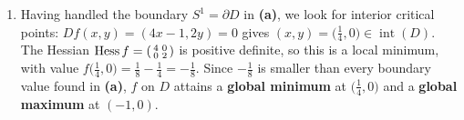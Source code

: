 \begin{exercisesolution}
\label{sol:extrema_circle_disk_interior}
\begin{enumerate}[label=\textbf{(\alph*)}, start=2]
  \item Having handled the boundary $S^1 = \partial D$ in \textbf{(a)}, we look for interior
    critical points: $Df(x,y) = (4x-1, 2y) = 0$ gives $(x,y) = \big(\tfrac14, 0\big) \in
    \operatorname{int}(D)$. The Hessian $\operatorname{Hess} f = \left(\begin{smallmatrix} 4 & 0 \\ 0 & 2\end{smallmatrix}\right)$ is
    positive definite, so this is a local minimum, with value $f\big(\tfrac14,0\big) =
    \tfrac18 - \tfrac14 = -\tfrac18$. Since $-\tfrac18$ is smaller than every boundary value found
    in \textbf{(a)}, $f$ on $D$ attains a \textbf{global minimum} at $\big(\tfrac14,0\big)$ and a
    \textbf{global maximum} at $(-1,0)$.
\end{enumerate}
\end{exercisesolution}

